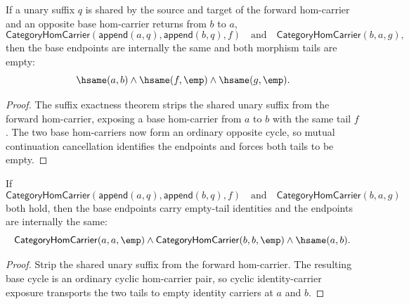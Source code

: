 \begin{theorem}
\label{thm:category-hom-carrier-unary-suffix-cycle-tails-empty}
If a unary suffix $q$ is shared by the source and target of the forward
hom-carrier and an opposite base hom-carrier returns from $b$ to $a$,
$$
\mathsf{CategoryHomCarrier}(\mathsf{append}(a,q),\mathsf{append}(b,q),f)
\quad\text{and}\quad
\mathsf{CategoryHomCarrier}(b,a,g),
$$
then the base endpoints are internally the same and both morphism tails are
empty:
$$
\hsame(a,b)\land \hsame(f,\emp)\land \hsame(g,\emp).
$$
\end{theorem}
\begin{proof}
The suffix exactness theorem strips the shared unary suffix from the forward
hom-carrier, exposing a base hom-carrier from $a$ to $b$ with the same tail
$f$. The two base hom-carriers now form an ordinary opposite cycle, so mutual
continuation cancellation identifies the endpoints and forces both tails to be
empty.
\end{proof}

\begin{theorem}
\label{thm:category-hom-carrier-unary-suffix-cycle-identity-carriers}
If
$$
\mathsf{CategoryHomCarrier}(\mathsf{append}(a,q),\mathsf{append}(b,q),f)
\quad\text{and}\quad
\mathsf{CategoryHomCarrier}(b,a,g)
$$
both hold, then the base endpoints carry empty-tail identities and the
endpoints are internally the same:
$$
\mathsf{CategoryHomCarrier}(a,a,\emp)\land
\mathsf{CategoryHomCarrier}(b,b,\emp)\land
\hsame(a,b).
$$
\end{theorem}
\begin{proof}
Strip the shared unary suffix from the forward hom-carrier. The resulting base
cycle is an ordinary cyclic hom-carrier pair, so cyclic identity-carrier
exposure transports the two tails to empty identity carriers at $a$ and $b$.
\end{proof}

